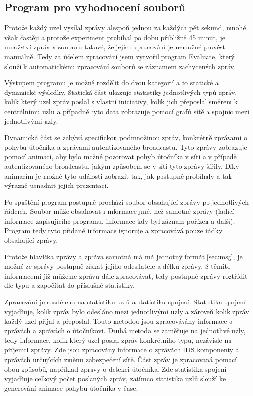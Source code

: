 \documentclass[11pt,final,twoside]{fithesis2}
\begin{document}
\subsection{Program pro vyhodnocení souborů}
Protože každý uzel vysílal zprávy alespoň jednou za každých pět sekund, mnohé však častěji a protože experiment probíhal po dobu 
přibližně 45 minut, je množství zpráv v souboru takové, že jejich zpracování je nemožné provést manuálně. Tedy za účelem zpracování 
jsem vytvořil program Evaluate, který slouží k automatickému zpracování souborů se záznamem zachycených zpráv. 

Výstupem programu je možné rozdělit do dvou kategorií a to statické a dynamické výsledky. Statická část ukazuje statistiky jednotlivých 
typů zpráv, kolik který uzel zpráv poslal z vlastní iniciativy, kolik jich přeposlal směrem k centrálnímu uzlu a případně tyto data 
zobrazuje pomocí grafů sítě a spojnic mezi jednotlivými uzly. 

Dynamická část se zabývá specifickou podmnožinou zpráv, konkrétně zprávami o pohybu útočníka a zprávami autentizovaného broadcastu. 
Tyto zprávy zobrazuje pomocí animací, aby bylo možné pozorovat pohyb útočníka v síti a v případě autentizovaného broadcastu, jakým 
způsobem se v síti tyto zprávy šířily. Díky animacím je možné tyto události zobrazit tak, jak postupně probíhaly a tak výrazně usnadnit 
jejich prezentaci. 

Po spuštění program postupně prochází soubor obsahující zprávy po jednotlivých řádcích. Soubor může obsahovat i informace jiné, než 
samotné zprávy (ladící informace zapisujícího programu, informace kdy byl záznam pořízen a další). Program tedy tyto přidané informace
ignoruje a zpracovává pouze řádky obsahující zprávy.

Protože hlavička zprávy a zpráva samotná má má jednotný formát \ref{sec:msg}, je možné ze správy postupně získat jejího odesílatele a délku zprávy. S těmito informacemi již můžeme zprávu dále zpracovávat, 
tedy postupně zprávy roztřídit dle typu a započítat do příslušné statistiky. 

Zpracování je rozděleno na statistiku uzlů a statistiku spojení. Statistika spojení vyjadřuje, kolik zpráv bylo odesláno mezi jednotlivými uzly a zároveň kolik zpráv každý uzel přijal a přeposlal. 
Touto metodou jsou zpracovávány informace o  zprávách a zprávách o útočníkovi. Druhá metoda se zaměřuje na jednotlivé uzly, tedy informace, kolik který uzel poslal zpráv konkrétního typu, 
nezávisle na příjemci zprávy. Zde jsou zpracovány informace o zprávách IDS komponenty a zprávách určujících změnu zabezpečení sítě. Část zpráv je zpracovaná pomocí obou způsobů, například zprávy o detekci
útočníka. Zde statistika spojení vyjadřuje celkový počet poslaných zpráv, zatímco statistika uzlů slouží ke generování animace pohybu útočníka v čase.
\end{document}
